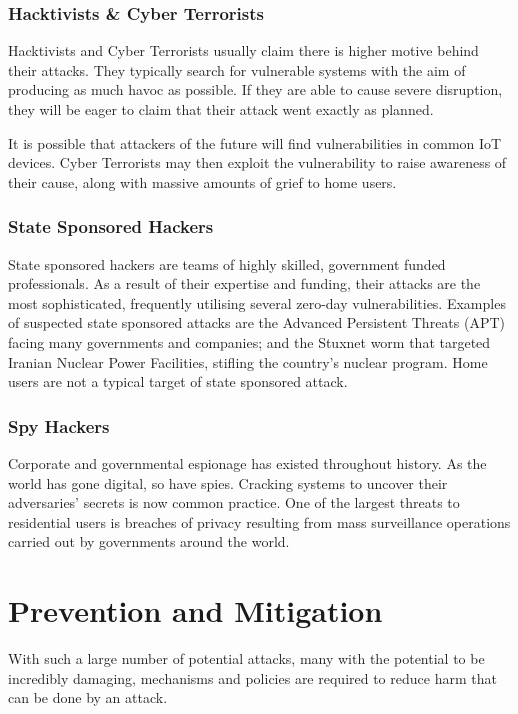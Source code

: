 \documentclass[10pt,journal,compsoc]{IEEEtran}
\begin{document}
\subsubsection{Hacktivists \& Cyber Terrorists}
Hacktivists and Cyber Terrorists usually claim there is higher motive behind
their attacks. They typically search for vulnerable systems with the aim of
producing as much havoc as possible. If they are able to cause severe
disruption, they will be eager to claim that their attack went exactly as
planned. 

It is possible that attackers of the future will find vulnerabilities in common
IoT devices. Cyber Terrorists may then exploit the vulnerability to raise
awareness of their cause, along with massive amounts of grief to home users. 

\subsubsection{State Sponsored Hackers}
State sponsored hackers are teams of highly skilled, government funded
professionals. As a result of their expertise and funding, their attacks are
the most sophisticated, frequently utilising several zero-day vulnerabilities.
Examples of suspected state sponsored attacks are the Advanced Persistent
Threats (APT) facing many governments and companies; and the Stuxnet worm
that targeted Iranian Nuclear Power Facilities, stifling the country's nuclear
program. Home users are not a typical target of state sponsored attack. 

\subsubsection{Spy Hackers}
Corporate and governmental espionage has existed throughout history. As the
world has gone digital, so have spies. Cracking systems to uncover their
adversaries' secrets is now common practice. One of the largest threats to
residential users is breaches of privacy resulting from mass surveillance
operations carried out by governments around the world.  


\section{Prevention and Mitigation}
With such a large number of potential attacks, many with the potential to be
incredibly damaging, mechanisms and policies are required to reduce harm that
can be done by an attack. 
\end{document}
